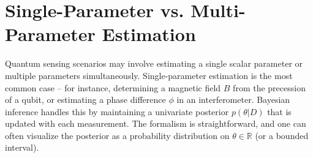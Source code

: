 \section{Single-Parameter vs. Multi-Parameter Estimation}

Quantum sensing scenarios may involve estimating a single scalar
parameter or multiple parameters simultaneously. Single-parameter
estimation is the most common case – for instance, determining a
magnetic field $B$ from the precession of a qubit, or estimating a
phase difference $\phi$ in an interferometer. Bayesian inference
handles this by maintaining a univariate posterior $p(\theta|D)$ that
is updated with each measurement. The formalism is straightforward,
and one can often visualize the posterior as a probability
distribution on $\theta \in \mathbb{R}$ (or a bounded interval).



